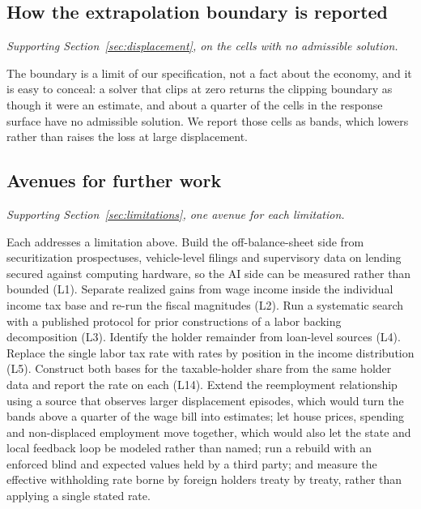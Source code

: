 \subsection{How the extrapolation boundary is reported}

\emph{Supporting Section~\ref{sec:displacement}, on the cells with no admissible solution.}

The boundary is a limit of our specification, not a fact about the economy, and it is easy to
conceal: a solver that clips at zero returns the clipping boundary as though it were an estimate,
and about a quarter of the cells in the response surface have no admissible solution. We report
those cells as bands, which lowers rather than raises the loss at large displacement.

\subsection{Avenues for further work}

\emph{Supporting Section~\ref{sec:limitations}, one avenue for each limitation.}

Each addresses a limitation above. Build the
off-balance-sheet side from securitization prospectuses, vehicle-level filings and supervisory data
on lending secured against computing hardware, so the AI side can be measured rather than bounded
(L1). Separate realized gains from wage income inside the individual income tax base and re-run
the fiscal magnitudes (L2). Run a systematic search with a published protocol for prior
constructions of a labor backing decomposition (L3). Identify the holder remainder from loan-level
sources (L4). Replace the single labor tax rate with rates by position in the income distribution
(L5). Construct both bases for the taxable-holder share from the same holder data and report the
rate on each (L14). Extend the reemployment relationship using a source that observes larger
displacement episodes, which would turn the bands above a quarter of the wage bill into estimates;
let house prices, spending and non-displaced employment move together, which would also let the
state and local feedback loop be modeled rather than named; run a rebuild with an enforced blind
and expected values held by a third party; and measure the effective withholding rate borne by
foreign holders treaty by treaty, rather than applying a single stated rate.


